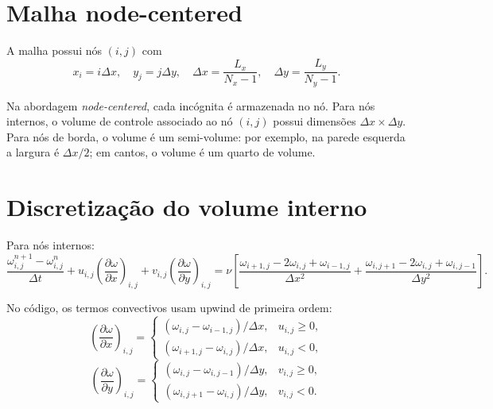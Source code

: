 \documentclass[12pt,a4paper]{article}
\begin{document}
\section*{Malha node-centered}

A malha possui nós $(i,j)$ com
\begin{equation}
x_i=i\Delta x,\quad y_j=j\Delta y,
\quad \Delta x=\frac{L_x}{N_x-1},\quad \Delta y=\frac{L_y}{N_y-1}.
\end{equation}

Na abordagem \textit{node-centered}, cada incógnita é armazenada no nó. Para nós internos, o volume de controle associado ao nó $(i,j)$ possui dimensões $\Delta x\times\Delta y$. Para nós de borda, o volume é um semi-volume: por exemplo, na parede esquerda a largura é $\Delta x/2$; em cantos, o volume é um quarto de volume.

\section*{Discretização do volume interno}

Para nós internos:
\begin{equation}
\frac{\omega_{i,j}^{n+1}-\omega_{i,j}^{n}}{\Delta t}
+ u_{i,j}\left(\frac{\partial\omega}{\partial x}\right)_{i,j}
+ v_{i,j}\left(\frac{\partial\omega}{\partial y}\right)_{i,j}
= \nu\left[
\frac{\omega_{i+1,j}-2\omega_{i,j}+\omega_{i-1,j}}{\Delta x^2}
+
\frac{\omega_{i,j+1}-2\omega_{i,j}+\omega_{i,j-1}}{\Delta y^2}
\right].
\end{equation}

No código, os termos convectivos usam upwind de primeira ordem:
\begin{equation}
\left(\frac{\partial\omega}{\partial x}\right)_{i,j}=
\begin{cases}
(\omega_{i,j}-\omega_{i-1,j})/\Delta x, & u_{i,j}\geq 0,\\
(\omega_{i+1,j}-\omega_{i,j})/\Delta x, & u_{i,j}<0,
\end{cases}
\end{equation}
\begin{equation}
\left(\frac{\partial\omega}{\partial y}\right)_{i,j}=
\begin{cases}
(\omega_{i,j}-\omega_{i,j-1})/\Delta y, & v_{i,j}\geq 0,\\
(\omega_{i,j+1}-\omega_{i,j})/\Delta y, & v_{i,j}<0.
\end{cases}
\end{equation}
\end{document}
